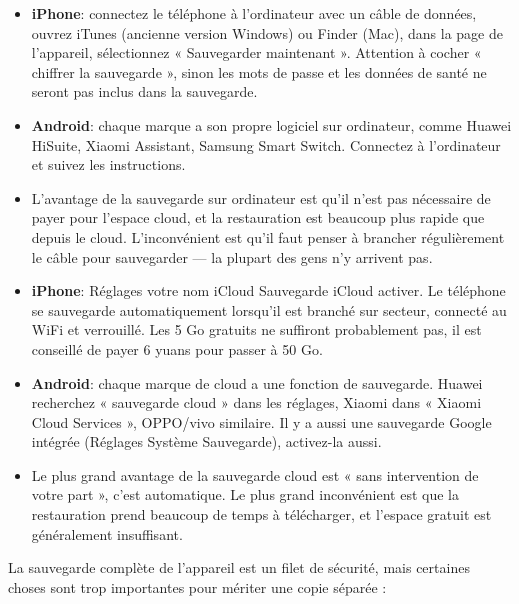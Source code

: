 \begin{itemize}
  \item \textbf{iPhone}: connectez le téléphone à l'ordinateur avec un câble de données, ouvrez iTunes (ancienne version Windows) ou Finder (Mac), dans la page de l'appareil, sélectionnez « Sauvegarder maintenant ». Attention à cocher « chiffrer la sauvegarde », sinon les mots de passe et les données de santé ne seront pas inclus dans la sauvegarde.
  \item \textbf{Android}: chaque marque a son propre logiciel sur ordinateur, comme Huawei HiSuite, Xiaomi Assistant, Samsung Smart Switch. Connectez à l'ordinateur et suivez les instructions.
  \item L'avantage de la sauvegarde sur ordinateur est qu'il n'est pas nécessaire de payer pour l'espace cloud, et la restauration est beaucoup plus rapide que depuis le cloud. L'inconvénient est qu'il faut penser à brancher régulièrement le câble pour sauvegarder — la plupart des gens n'y arrivent pas.
\end{itemize}


\begin{itemize}
  \item \textbf{iPhone}: Réglages votre nom iCloud Sauvegarde iCloud activer. Le téléphone se sauvegarde automatiquement lorsqu'il est branché sur secteur, connecté au WiFi et verrouillé. Les 5 Go gratuits ne suffiront probablement pas, il est conseillé de payer 6 yuans pour passer à 50 Go.
  \item \textbf{Android}: chaque marque de cloud a une fonction de sauvegarde. Huawei recherchez « sauvegarde cloud » dans les réglages, Xiaomi dans « Xiaomi Cloud Services », OPPO/vivo similaire. Il y a aussi une sauvegarde Google intégrée (Réglages Système Sauvegarde), activez-la aussi.
  \item Le plus grand avantage de la sauvegarde cloud est « sans intervention de votre part », c'est automatique. Le plus grand inconvénient est que la restauration prend beaucoup de temps à télécharger, et l'espace gratuit est généralement insuffisant.
\end{itemize}


La sauvegarde complète de l'appareil est un filet de sécurité, mais certaines choses sont trop importantes pour mériter une copie séparée :

